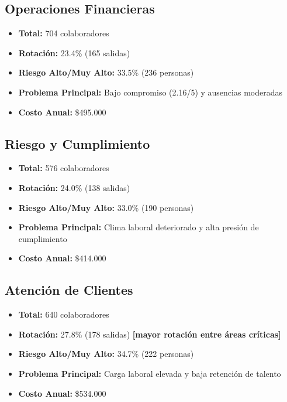 \documentclass[11pt,a4paper,twoside]{article}
\begin{document}
\subsection{Operaciones Financieras}

\begin{itemize}
    \item \textbf{Total:} 704 colaboradores
    \item \textbf{Rotación:} 23.4\% (165 salidas)
    \item \textbf{Riesgo Alto/Muy Alto:} 33.5\% (236 personas)
    \item \textbf{Problema Principal:} Bajo compromiso (2.16/5) y ausencias moderadas
    \item \textbf{Costo Anual:} \$495.000
\end{itemize}

\subsection{Riesgo y Cumplimiento}

\begin{itemize}
    \item \textbf{Total:} 576 colaboradores
    \item \textbf{Rotación:} 24.0\% (138 salidas)
    \item \textbf{Riesgo Alto/Muy Alto:} 33.0\% (190 personas)
    \item \textbf{Problema Principal:} Clima laboral deteriorado y alta presión de cumplimiento
    \item \textbf{Costo Anual:} \$414.000
\end{itemize}

\subsection{Atención de Clientes}

\begin{itemize}
    \item \textbf{Total:} 640 colaboradores
    \item \textbf{Rotación:} 27.8\% (178 salidas) \textbf{[mayor rotación entre áreas críticas]}
    \item \textbf{Riesgo Alto/Muy Alto:} 34.7\% (222 personas)
    \item \textbf{Problema Principal:} Carga laboral elevada y baja retención de talento
    \item \textbf{Costo Anual:} \$534.000
\end{itemize}
\end{document}
